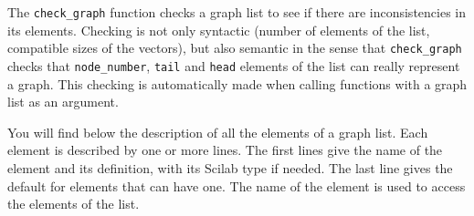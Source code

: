 \documentclass[11pt]{article}
\newcommand{\func}[1]{\texttt{#1}}
\begin{document}
The \func{check\_graph} function checks a graph list to see if
there are inconsistencies in its elements. Checking is not only
syntactic (number of elements of the list, compatible sizes 
of the vectors), but also semantic in the sense that 
\func{check\_graph} checks that \texttt{node\_number}, \texttt{tail} and 
\texttt{head} elements of the list can really represent a  graph.
This checking is automatically made when calling functions with a
graph list as an argument.

You will find below the description of all the elements of a graph list.
Each element is described by one or more lines.
The first lines give the name of the element and
its definition, with its Scilab type if
needed.
The last line gives the default for elements that can have one.
The name of the element is used to access 
the elements
of the list.
\end{document}

